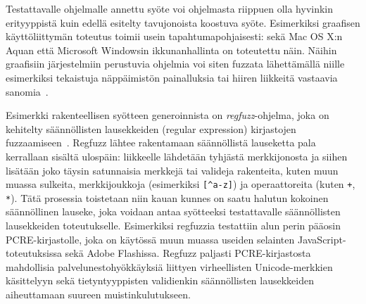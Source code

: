 Testattavalle ohjelmalle annettu syöte voi ohjelmasta riippuen olla
hyvinkin erityyppistä kuin edellä esitelty tavujonoista koostuva syöte.
Esimerkiksi graafisen käyttöliittymän toteutus toimii usein tapahtumapohjaisesti:
sekä Mac OS X:n Aquan että Microsoft Windowsin ikkunanhallinta on toteutettu näin.
Näihin graafisiin järjestelmiin perustuvia ohjelmia voi siten fuzzata lähettämällä
niille esimerkiksi tekaistuja näppäimistön painalluksia tai hiiren liikkeitä vastaavia
sanomia~\cite{MacOsFuzz,WinNtFuzz}.

Esimerkki rakenteellisen syötteen generoinnista on \emph{regfuzz}-ohjelma,
joka on kehitelty säännöllisten lausekkeiden (regular expression) kirjastojen
fuzzaamiseen~\cite{RegFuzz}.
Regfuzz lähtee rakentamaan säännöllistä lauseketta pala kerrallaan sisältä ulospäin:
liikkeelle lähdetään tyhjästä merkkijonosta ja siihen lisätään joko täysin
satunnaisia merkkejä tai valideja rakenteita,
kuten muun muassa sulkeita, merkkijoukkoja (esimerkiksi \texttt{[\^{}a-z]}) ja
operaattoreita (kuten \texttt{+}, \texttt{*}).
Tätä prosessia toistetaan niin kauan kunnes on saatu halutun kokoinen säännöllinen lauseke,
joka voidaan antaa syötteeksi testattavalle säännöllisten lausekkeiden toteutukselle.
Esimerkiksi regfuzzia testattiin alun perin pääosin PCRE-kirjastolle,
joka on käytössä muun muassa useiden selainten JavaScript-toteutuksissa sekä Adobe Flashissa.
Regfuzz paljasti PCRE-kirjastosta mahdollisia palvelunestohyökkäyksiä liittyen
virheellisten Unicode-merkkien käsittelyyn sekä tietyntyyppisten validienkin
säännöllisten lausekkeiden aiheuttamaan suureen muistinkulutukseen.

